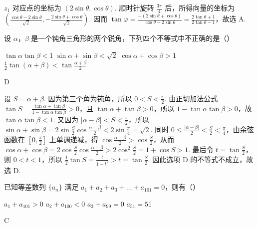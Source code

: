 \begin{solution}
\(z_{1}\) 对应点的坐标为 \((2\sin\theta,\cos\theta)\). 顺时针旋转 \(\frac{3\pi}{4}\) 后，所得向量的坐标为 \(\left(\frac{\cos\theta-2\sin\theta}{\sqrt{2}},-\frac{2\sin\theta+\cos\theta}{\sqrt{2}}\right)\). 因而 \(\tan\varphi=\frac{-(2\sin\theta+\cos\theta)}{\cos\theta-2\sin\theta}=\frac{2\tan\theta+1}{2\tan\theta-1}\)，故选 A.
\end{solution}

\begin{problem}
设 \(\alpha\)，\(\beta\) 是一个钝角三角形的两个锐角，下列四个不等式中不正确的是（\quad）

\choices
    {\(\tan\alpha\tan\beta<1\)}
    {\(\sin\alpha+\sin\beta<\sqrt{2}\)}
    {\(\cos\alpha+\cos\beta>1\)}
    {\(\frac{1}{2}\tan\left(\alpha+\beta\right)<\tan\frac{\alpha+\beta}{2}\)}
\end{problem}

\begin{answer}
D
\end{answer}

\begin{solution}
设 \(S=\alpha+\beta\). 因为第三个角为钝角，所以 \(0<S<\frac{\pi}{2}\). 由正切加法公式
\(\tan S=\frac{\tan\alpha+\tan\beta}{1-\tan\alpha\tan\beta}>0\)，且 \(\tan\alpha+\tan\beta>0\)，所以 \(1-\tan\alpha\tan\beta>0\)，故 \(\tan\alpha\tan\beta<1\). 又因为 \(\lvert\alpha-\beta\rvert<S<\frac{\pi}{2}\)，所以
\(\sin\alpha+\sin\beta=2\sin\frac{S}{2}\cos\frac{\alpha-\beta}{2}<2\sin\frac{\pi}{4}=\sqrt{2}\).
同时 \(0\leq\frac{\lvert\alpha-\beta\rvert}{2}<\frac{S}{2}<\frac{\pi}{4}\)，由余弦函数在 \([0,\frac{\pi}{2}]\) 上单调递减，得
\(\cos\frac{\alpha-\beta}{2}>\cos\frac{S}{2}\)，从而 \(\cos\alpha+\cos\beta=2\cos\frac{S}{2}\cos\frac{\alpha-\beta}{2}>2\cos^{2}\frac{S}{2}=1+\cos S>1\). 最后令 \(t=\tan\frac{S}{2}\)，则 \(0<t<1\)，所以 \(\frac{1}{2}\tan S=\frac{t}{1-t^{2}}>t=\tan\frac{S}{2}\). 因此选项 D 的不等式不成立，故选 D.
\end{solution}

\begin{problem}
已知等差数列 \(\{a_{n}\}\) 满足 \(a_{1}+a_{2}+a_{3}+\dots+a_{101}=0\)，则有（\quad）

\choices
    {\(a_{1}+a_{101}>0\)}
    {\(a_{2}+a_{100}<0\)}
    {\(a_{3}+a_{99}=0\)}
    {\(a_{51}=51\)}
\end{problem}

\begin{answer}
C
\end{answer}

